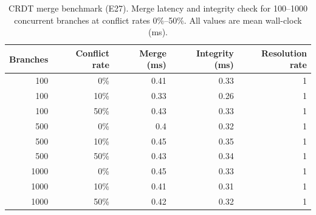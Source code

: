 \begin{table}[htbp]
\centering
\footnotesize
\caption{CRDT merge benchmark (E27). Merge latency and integrity check for 100--1000 concurrent branches at conflict rates 0\%--50\%. All values are mean wall-clock (ms).}
\label{tab:e27-results}
\begin{tabular}{@{}rrrrr@{}}
\toprule
\textbf{Branches} & \textbf{Conflict rate} & \textbf{Merge (ms)} & \textbf{Integrity (ms)} & \textbf{Resolution rate} \\
\midrule
100 & 0\% & 0.41 & 0.33 & 1 \\
100 & 10\% & 0.33 & 0.26 & 1 \\
100 & 50\% & 0.43 & 0.33 & 1 \\
500 & 0\% & 0.4 & 0.32 & 1 \\
500 & 10\% & 0.45 & 0.35 & 1 \\
500 & 50\% & 0.43 & 0.34 & 1 \\
1000 & 0\% & 0.45 & 0.33 & 1 \\
1000 & 10\% & 0.41 & 0.31 & 1 \\
1000 & 50\% & 0.42 & 0.32 & 1 \\
\bottomrule
\end{tabular}
\end{table}
